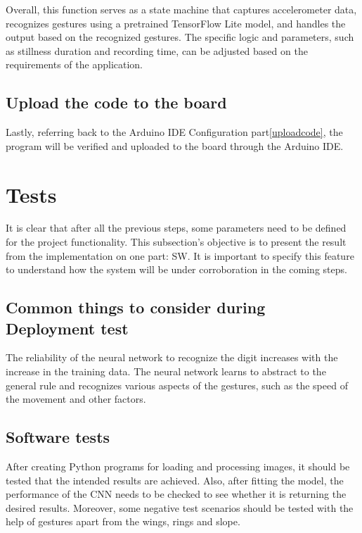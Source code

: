 		Overall, this function serves as a state machine that captures accelerometer data, recognizes gestures using a pretrained TensorFlow Lite model, and handles the output based on the recognized gestures. The specific logic and parameters, such as stillness duration and recording time, can be adjusted based on the requirements of the application.
		
		\subsection{Upload the code to the board}
		Lastly, referring back to the Arduino IDE Configuration part\ref{uploadcode}, the program will be verified and uploaded to the board through the Arduino IDE. 
		
		\section{Tests}
		It is clear that after all the previous steps, some parameters need to be defined for the project functionality. This subsection’s objective is to present the result from the implementation on one part: SW. It is important to specify this feature to understand how the system will be under corroboration in the coming steps.
		
		\subsection{Common things to consider during Deployment test}
		The reliability of the neural network to recognize the digit increases with the increase in the training data. The neural network learns to abstract to the general rule and recognizes various aspects of the gestures, such as the speed of the movement and other factors.
		
		\subsection{Software tests}
		After creating Python programs for loading and processing images,
		it should be tested that the intended results are achieved. Also, after fitting the model, the performance of the CNN needs to be checked to see whether it is returning the desired results. Moreover, some negative test scenarios should be tested with the help of gestures apart from the wings, rings and slope.
		
